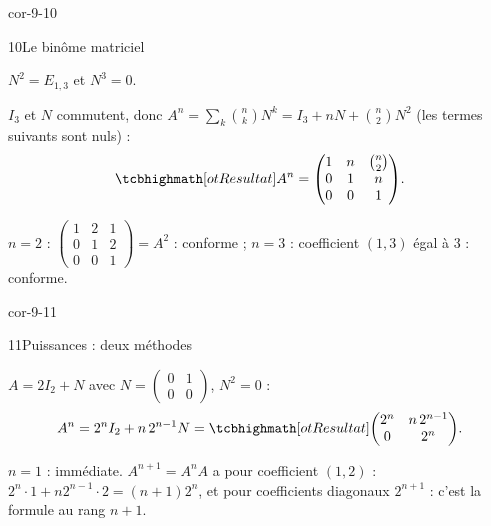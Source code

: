 \begin{blocLivre}{cor-9-10}
\begin{corrige}{10}{Le binôme matriciel}
\begin{questions}
  \item $N^{2}=E_{1,3}$ et $N^{3}=0$.
  \item $I_3$ et $N$ commutent, donc
    $A^{n}=\sum_{k}\binom{n}{k}N^{k}=I_3+nN+\binom{n}{2}N^{2}$ (les termes
    suivants sont nuls) :
    \[
      \res{A^{n}=\begin{pmatrix}1&n&\binom{n}{2}\\0&1&n\\0&0&1\end{pmatrix}}.
    \]
  \item $n=2$ : $\begin{pmatrix}1&2&1\\0&1&2\\0&0&1\end{pmatrix}=A^{2}$ : conforme ;
    $n=3$ : coefficient $(1,3)$ égal à $3$ : conforme.
\end{questions}
\end{corrige}
\end{blocLivre}

\begin{blocLivre}{cor-9-11}
\begin{corrige}{11}{Puissances : deux méthodes}
\begin{questions}
  \item $A=2I_2+N$ avec $N=\begin{pmatrix}0&1\\0&0\end{pmatrix}$,
    $N^{2}=0$ :
    \[
      A^{n}=2^{n}I_2+n\,2^{n-1}N
      =\res{\begin{pmatrix}2^{n}&n\,2^{n-1}\\0&2^{n}\end{pmatrix}}.
    \]
  \item {} $n=1$ : immédiate.
     $A^{n+1}=A^{n}A$ a pour coefficient $(1,2)$ :
    $2^{n}\cdot1+n2^{n-1}\cdot2=(n+1)2^{n}$, et pour coefficients
    diagonaux $2^{n+1}$ : c'est la formule au rang $n+1$.
\end{questions}
\end{corrige}
\end{blocLivre}

